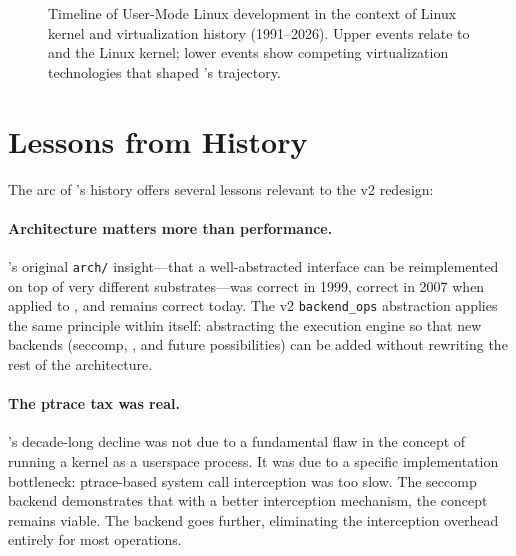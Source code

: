\begin{figure}[htbp]

\caption{Timeline of User-Mode Linux development in the context of Linux
  kernel and virtualization history (1991--2026).  Upper events relate to
  \UML{} and the Linux kernel; lower events show competing virtualization
  technologies that shaped \UML{}'s trajectory.}
\label{fig:timeline}
\end{figure}

\section{Lessons from History}
\label{sec:history-lessons}

The arc of \UML{}'s history offers several lessons relevant to the v2
redesign:

\paragraph{Architecture matters more than performance.}
\UML{}'s original \texttt{arch/} insight---that a well-abstracted interface
can be reimplemented on top of very different substrates---was correct in
1999, correct in 2007 when applied to \KVM{}, and remains correct today.
The v2 \texttt{backend\_ops} abstraction applies the same principle within
\UML{} itself: abstracting the execution engine so that new backends (seccomp,
\KVM{}, and future possibilities) can be added without rewriting the rest of
the architecture.

\paragraph{The ptrace tax was real.}
\UML{}'s decade-long decline was not due to a fundamental flaw in the concept
of running a kernel as a userspace process.  It was due to a specific
implementation bottleneck: ptrace-based system call interception was too slow.
The seccomp backend demonstrates that with a better interception mechanism,
the concept remains viable.  The \KVMvTwo{} backend goes further, eliminating
the interception overhead entirely for most operations.

